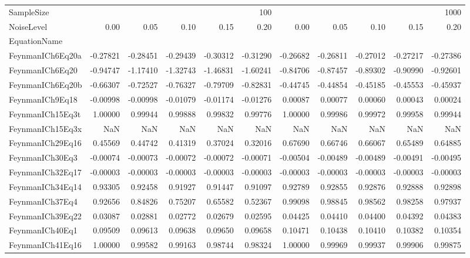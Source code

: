 \begin{tabular}{lrrrrrrrrrr}
\toprule
SampleSize & \multicolumn{5}{r}{100} & \multicolumn{5}{r}{1000} \\
NoiseLevel & 0.00 & 0.05 & 0.10 & 0.15 & 0.20 & 0.00 & 0.05 & 0.10 & 0.15 & 0.20 \\
EquationName &  &  &  &  &  &  &  &  &  &  \\
\midrule
FeynmanICh6Eq20a & -0.27821 & -0.28451 & -0.29439 & -0.30312 & -0.31290 & -0.26682 & -0.26811 & -0.27012 & -0.27217 & -0.27386 \\
FeynmanICh6Eq20 & -0.94747 & -1.17410 & -1.32743 & -1.46831 & -1.60241 & -0.84706 & -0.87457 & -0.89302 & -0.90990 & -0.92601 \\
FeynmanICh6Eq20b & -0.66307 & -0.72527 & -0.76327 & -0.79709 & -0.82831 & -0.44745 & -0.44854 & -0.45185 & -0.45553 & -0.45937 \\
FeynmanICh9Eq18 & -0.00998 & -0.00998 & -0.01079 & -0.01174 & -0.01276 & 0.00087 & 0.00077 & 0.00060 & 0.00043 & 0.00024 \\
FeynmanICh15Eq3t & 1.00000 & 0.99944 & 0.99888 & 0.99832 & 0.99776 & 1.00000 & 0.99986 & 0.99972 & 0.99958 & 0.99944 \\
FeynmanICh15Eq3x & NaN & NaN & NaN & NaN & NaN & NaN & NaN & NaN & NaN & NaN \\
FeynmanICh29Eq16 & 0.45569 & 0.44742 & 0.41319 & 0.37024 & 0.32016 & 0.67690 & 0.66746 & 0.66067 & 0.65489 & 0.64885 \\
FeynmanICh30Eq3 & -0.00074 & -0.00073 & -0.00072 & -0.00072 & -0.00071 & -0.00504 & -0.00489 & -0.00489 & -0.00491 & -0.00495 \\
FeynmanICh32Eq17 & -0.00003 & -0.00003 & -0.00003 & -0.00003 & -0.00003 & -0.00003 & -0.00003 & -0.00003 & -0.00003 & -0.00003 \\
FeynmanICh34Eq14 & 0.93305 & 0.92458 & 0.91927 & 0.91447 & 0.91097 & 0.92789 & 0.92855 & 0.92876 & 0.92888 & 0.92898 \\
FeynmanICh37Eq4 & 0.92656 & 0.84826 & 0.75207 & 0.65582 & 0.52367 & 0.99098 & 0.98845 & 0.98562 & 0.98258 & 0.97937 \\
FeynmanICh39Eq22 & 0.03087 & 0.02881 & 0.02772 & 0.02679 & 0.02595 & 0.04425 & 0.04410 & 0.04400 & 0.04392 & 0.04383 \\
FeynmanICh40Eq1 & 0.09509 & 0.09613 & 0.09638 & 0.09650 & 0.09658 & 0.10471 & 0.10438 & 0.10410 & 0.10382 & 0.10354 \\
FeynmanICh41Eq16 & 1.00000 & 0.99582 & 0.99163 & 0.98744 & 0.98324 & 1.00000 & 0.99969 & 0.99937 & 0.99906 & 0.99875 \\

\end{tabular}
